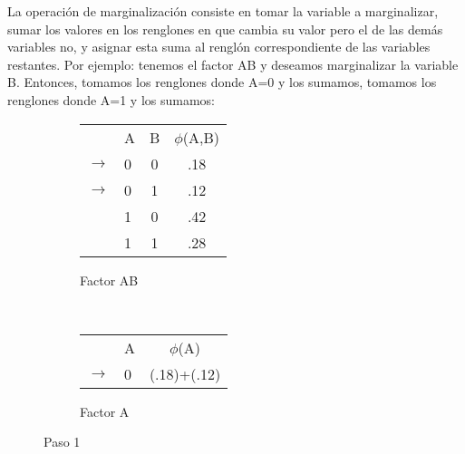 La operación de marginalización consiste en tomar la variable a marginalizar, sumar los valores en los renglones en que cambia su valor pero el de las demás variables no, y asignar esta suma al renglón correspondiente de las variables restantes. Por ejemplo: tenemos el factor AB y deseamos marginalizar la variable B. Entonces, tomamos los renglones donde A=0 y los sumamos, tomamos los renglones donde A=1 y los sumamos:

\begin{figure}[H]
    \centering
    \begin{subfigure}[b]{0.4\textwidth}
        \centering
        \begin{tabular}{ l l  c | c }
           & A & B & $\phi$(A,B)\\ \cline{2-4}
          \(\to\) & 0 & 0 & .18  \\ \cline{2-4}
          \(\to\) & 0 & 1 & .12  \\ \cline{2-4}
           & 1 & 0 & .42  \\ \cline{2-4}
           & 1 & 1 & .28  \\
        \end{tabular}
        \caption{Factor AB}
    \end{subfigure}
    ~ 
    \begin{subfigure}[b]{0.4\textwidth}
        \centering
        \begin{tabular}{l  l | c }
            & A & $\phi$(A)\\ \cline{2-3}
        \(\to\) & 0 & (.18)+(.12)  \\
        \end{tabular}
        \caption{Factor A}
    \end{subfigure}
    \caption{Paso 1}
\end{figure}



